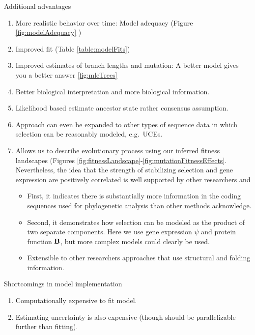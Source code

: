 \documentclass{article}
\newcommand{\Func}{\ensuremath{\text{\textbf{B}}}\xspace}
\begin{document}
Additional advantages
\begin{enumerate}
\item More realistic behavior over time: Model adequacy (Figure \ref{fig:modelAdequacy} )
\item Improved fit (Table \ref{table:modelFits})
\item Improved estimates of branch lengths and mutation: A better model gives you a better answer \ref{fig:mleTrees}
\item Better biological interpretation and more biological information.
\item Likelihood based estimate ancestor state rather consensus assumption.
\item Approach can even be expanded to other types of sequence data in which selection can be reasonably modeled, e.g.~UCEs.
\item Allows us to describe evolutionary process using our inferred fitness landscapes (Figures \ref{fig:fitnessLandscape}-\ref{fig:mutationFitnessEffects}.
Nevertheless, the idea that the strength of stabilizing selection and gene expression are positively correlated is well supported by other researchers \citep[e.g.~][]{DrummondEtAl2005} and 
\begin{itemize}
\item First, it indicates there is substantially more information in the coding sequences used for phylogenetic analysis than other methods acknowledge.
\item Second, it demonstrates how selection can be modeled as the product of two separate components.
  Here we use gene expression $\psi$ and protein function \Func, but more complex models could clearly be used.  
\item Extensible to other researchers approaches that use structural and folding  information.
\end{itemize}

\end{enumerate}



Shortcomings in model implementation
\begin{enumerate}
\item Computationally expensive to fit model.
\item Estimating uncertainty is also expensive (though should be parallelizable further than fitting).
  \end{enumerate}
\end{document}
